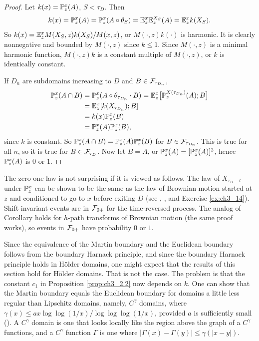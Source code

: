 \begin{proof}
Let $k(x) = \P_z^x(A)$, $S < \tau_D$. Then
\[
    k(x) = \P_z^x(A) = \P_z^x(A \circ \theta_S) = \E_z^x\E_z^{X_S}(A) = \E_z^xk(X_S).
\]
\mnewpage
So $k(x) = \E_z^xM(X_S,z)k(X_S)/M(x,z)$, or $M(\cdot,z)k(\cdot)$ is harmonic. It is clearly nonnegative and bounded by $M(\cdot,z)$ since $k \leq 1$. Since $M(\cdot,z)$ is a minimal harmonic function, $M(\cdot,z)k$ is a constant multiple of $M(\cdot,z)$, or $k$ is identically constant.

If $D_n$ are subdomains increasing to $D$ and $B \in \FC_{\tau_{D_n}}$,
\begin{align*}
    \P_z^x(A \cap B) &= \P_z^x(A \circ \theta_{\tau_{D_n}} \cdot B)  = \E_z^x\big[\P_z^{X(\tau_{D_n})}(A); B\big] \\
    &= \E_z^x[k(X_{\tau_{D_n}});B] \\
    &= k(x)\P_z^x(B) \\
    &= \P_z^x(A)\P_z^x(B),
\end{align*}
since $k$ is constant. So $\P_z^x(A \cap B) = \P_z^x(A)\P_z^x(B)$ for $B \in \FC_{\tau_{D_n}}$. This is true for all $n$, so it is true for $B\in \FC_{\tau_D}$. Now let $B = A$, or $\P_z^x(A) = [\P_z^x(A)]^2$, hence $\P_z^x(A)$ is $0$ or $1$.
\end{proof}

The zero-one law is not surprising if it is viewed as follows. The law of $X_{\tau_D-t}$ under $\P_z^x$ can be shown to be the same as the law of Brownian motion started at $z$ and conditioned to go to $x$ before exiting $D$ (see \cite{Williams1979}, \cite{ChungWalsh1969}, and Exercise \ref{ex:ch3_14}). Shift invariant events are in $\FC_{0+}$ for the time-reversed process. The analog of Corollary  holds for $h$-path transforms of Brownian motion (the same proof works), so events in $\FC_{0+}$ have probability $0$ or $1$.


Since the equivalence of the Martin boundary and the Euclidean boundary follows from the boundary Harnack principle, and since the boundary Harnack principle holds in H\"older domains, one might expect that the results of this section hold for H\"older domains. That is not the case. The problem is that the constant $c_1$ in Proposition \ref{prop:ch3_2.2} now depends on $k$. One can show that the Martin boundary equals the Euclidean boundary for domains a little less regular than Lipschitz domains, namely, $C^\gamma$ domains, where $\gamma(x) \leq ax\log\log(1/x)/\log\log\log(1/x)$, provided $a$ is sufficiently small (\cite{BassBurdzy1993}). A $C^\gamma$ domain is one that looks locally like the region above the graph of a $C^\gamma$ functions, and a $C^\gamma$ function $\Gamma$ is one where $|\Gamma(x)-\Gamma(y)| \leq \gamma(|x-y|)$.

